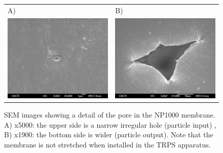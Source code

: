 \documentclass[journal=langd5,manuscript=article]{achemso}
\begin{document}
\begin{figure}
\begin{tabular}{|l|l|}
\hline
A) & B) \\
\includegraphics[width=0.5\linewidth]{Figures/NP1000-016.jpg}  &
\includegraphics[width=0.5\linewidth]{Figures/NP1000-021.jpg}  \\
\hline
\end{tabular}
\label{fgr:NP1000}
\caption{SEM images showing a detail of the pore in the NP1000 membrane. A) x5000: the upper side is a narrow irregular hole (particle input) , B) x1900: the bottom side is wider (particle output). Note that the membrane is not stretched when installed in the TRPS apparatus.}
%
\end{figure}
\end{document}

